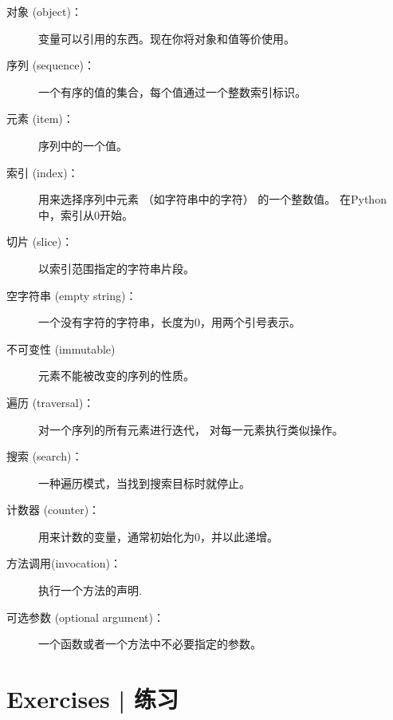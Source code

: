 \begin{description}

\item[对象 (object)：] 变量可以引用的东西。现在你将对象和值等价使用。

\item[序列 (sequence)：] 一个有序的值的集合，每个值通过一个整数索引标识。

\item[元素 (item)：] 序列中的一个值。

\item[索引 (index)：] 用来选择序列中元素 （如字符串中的字符） 的一个整数值。 在Python中，索引从0开始。

\item[切片 (slice)：] 以索引范围指定的字符串片段。

\item[空字符串 (empty string)：] 一个没有字符的字符串，长度为0，用两个引号表示。

\item[不可变性 (immutable)] 元素不能被改变的序列的性质。

\item[遍历 (traversal)：] 对一个序列的所有元素进行迭代， 对每一元素执行类似操作。

\item[搜索 (search)：] 一种遍历模式，当找到搜索目标时就停止。
  

\item[计数器 (counter)：] 用来计数的变量，通常初始化为0，并以此递增。

\item[方法调用(invocation)：] 执行一个方法的声明.

\item[可选参数 (optional argument)：] 一个函数或者一个方法中不必要指定的参数。
  

\end{description}


\section{Exercises  |  练习}

